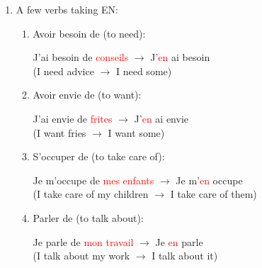 \documentclass{book}
\begin{document}
        \begin{enumerate}
            \item A few verbs taking EN:
                \begin{enumerate}
                    \item Avoir besoin de (to need):
                        \begin{center}
                            J'ai besoin de \textcolor{red}{conseils} $\to$ J'\textcolor{red}{en} ai besoin \\
                            (I need advice $\to$ I need some)
                        \end{center}
                    \item Avoir envie de (to want):
                        \begin{center}
                            J'ai envie de \textcolor{red}{frites} $\to$ J'\textcolor{red}{en} ai envie \\
                            (I want fries $\to$ I want some)
                        \end{center}
                    \item S'occuper de (to take care of):
                        \begin{center}
                            Je m'occupe de \textcolor{red}{mes enfants} $\to$ Je m'\textcolor{red}{en} occupe \\
                            (I take care of my children $\to$ I take care of them)
                        \end{center}
                    \item Parler de (to talk about):
                        \begin{center}
                            Je parle de \textcolor{red}{mon travail} $\to$ Je \textcolor{red}{en} parle \\
                            (I talk about my work $\to$ I talk about it)
                        \end{center}
                \end{enumerate}


\end{enumerate}
\end{document}
